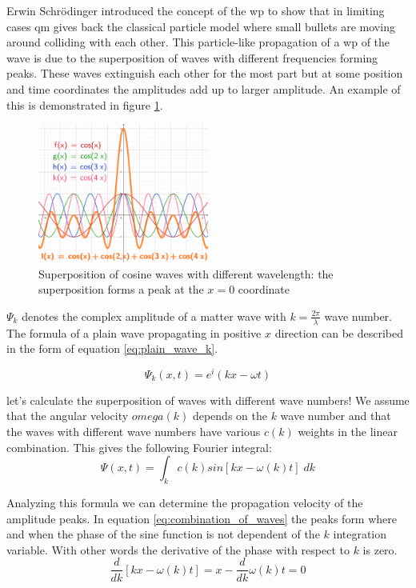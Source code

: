 Erwin Schrödinger introduced the concept of the \acrfull{wp} to show that in limiting cases \acrshort{qm} gives back the classical particle model where small bullets are moving around colliding with each other.
This particle-like propagation of a \acrshort{wp} of the wave is due to the superposition of waves with different frequencies forming peaks.
These waves extinguish each other for the most part but at some position and time coordinates the amplitudes add up to larger amplitude.
An example of this is demonstrated in figure \ref{fig:superposition}.
\begin{figure}
	\centering
	\includegraphics[width=0.5\textwidth]{figures/Superposition of cosine waves.png}
	\caption{Superposition of cosine waves with different wavelength: the superposition forms a peak at the $x = 0$ coordinate}
	\label{fig:superposition}
\end{figure}

$\Psi_k$ denotes the complex amplitude of a matter wave with $k=\frac{2\pi}{\lambda}$ wave number. The formula of a plain wave propagating in positive $x$ direction can be described in the form of equation \ref{eq:plain_wave_k}.

\begin{equation}
	\label{eq:plain_wave_k}
	\Psi_k(x, t) = e^i(kx - \omega t)
\end{equation}

let's calculate the superposition of waves with different wave numbers! We assume that the angular velocity $omega(k)$ depends on the $k$ wave number and that the waves with different wave numbers have various $c(k)$ weights in the linear combination. This gives the following Fourier integral:
\begin{equation}
	\label{eq:combination_of_waves}
	\Psi(x, t) = \int_k c(k) sin[kx - \omega(k)t]\; dk
\end{equation}

Analyzing this formula we can determine the propagation velocity of the amplitude peaks.
In equation \ref{eq:combination_of_waves} the peaks form where and when the phase of the sine function is not dependent of the $k$ integration variable. With other words the derivative of the phase with respect to $k$ is zero.
\begin{equation}
	\label{eq:derivative_of_phase}
	\frac{d}{dk}[kx - \omega(k)t] = x - \frac{d}{dk}\omega(k)t = 0
\end{equation}

